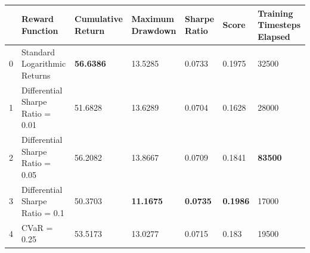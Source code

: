\begin{tabular}{lllllll}
\toprule
 & Reward Function & Cumulative Return & Maximum Drawdown & Sharpe Ratio & Score & Training Timesteps Elapsed \\
\midrule
0 & Standard Logarithmic Returns & \textbf{56.6386} & 13.5285 & 0.0733 & 0.1975 & 32500 \\
1 & Differential Sharpe Ratio = 0.01 & 51.6828 & 13.6289 & 0.0704 & 0.1628 & 28000 \\
2 & Differential Sharpe Ratio = 0.05 & 56.2082 & 13.8667 & 0.0709 & 0.1841 & \textbf{83500} \\
3 & Differential Sharpe Ratio = 0.1 & 50.3703 & \textbf{11.1675} & \textbf{0.0735} & \textbf{0.1986} & 17000 \\
4 & CVaR = 0.25 & 53.5173 & 13.0277 & 0.0715 & 0.183 & 19500 \\
\bottomrule
\end{tabular}
